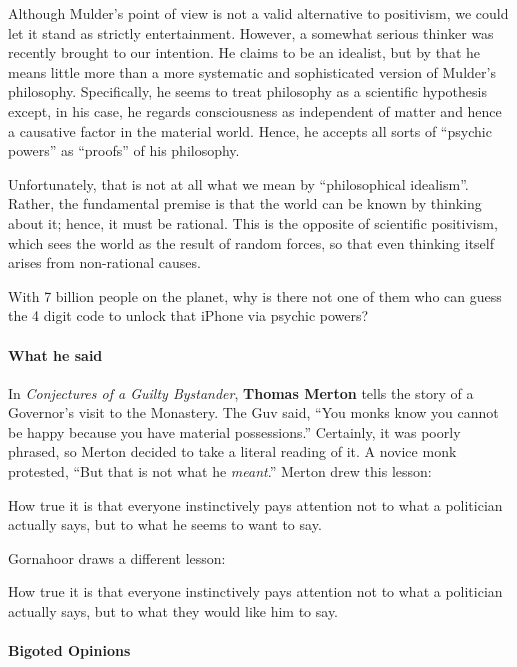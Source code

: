 Although Mulder's point of view is not a valid alternative to positivism, we could let it stand as strictly entertainment. However, a somewhat serious thinker was recently brought to our intention. He claims to be an idealist, but by that he means little more than a more systematic and sophisticated version of Mulder's philosophy. Specifically, he seems to treat philosophy as a scientific hypothesis except, in his case, he regards consciousness as independent of matter and hence a causative factor in the material world. Hence, he accepts all sorts of ``psychic powers'' as ``proofs'' of his philosophy.

Unfortunately, that is not at all what we mean by ``philosophical idealism''. Rather, the fundamental premise is that the world can be known by thinking about it; hence, it must be rational. This is the opposite of scientific positivism, which sees the world as the result of random forces, so that even thinking itself arises from non-rational causes.

With 7 billion people on the planet, why is there not one of them who can guess the 4 digit code to unlock that iPhone via psychic powers?

\paragraph{What he said}


In \emph{Conjectures of a Guilty Bystander}, \textbf{Thomas Merton} tells the story of a Governor's visit to the Monastery. The Guv said, ``You monks know you cannot be happy because you have material possessions.'' Certainly, it was poorly phrased, so Merton decided to take a literal reading of it. A novice monk protested, ``But that is not what he \emph{meant}.'' Merton drew this lesson:

\begin{quotex}
How true it is that everyone instinctively pays attention not to what a politician actually says, but to what he seems to want to say.
\end{quotex}


Gornahoor draws a different lesson:

\begin{quotex}
How true it is that everyone instinctively pays attention not to what a politician actually says, but to what they would like him to say.
\end{quotex}


\paragraph{Bigoted Opinions}


